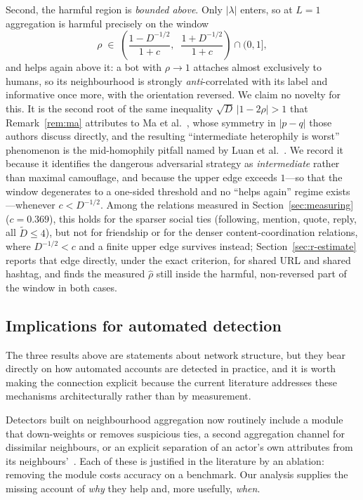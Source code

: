 \documentclass[../elsevier.tex]{subfiles}
\begin{document}
Second, the harmful region is \emph{bounded above}. Only $|\lambda|$ enters, so at
$L=1$ aggregation is harmful precisely on the window
\begin{equation}
    \rho \;\in\;
    \left(\frac{1 - D^{-1/2}}{1+c},\;\; \frac{1 + D^{-1/2}}{1+c}\right)
    \cap (0,1] ,
    \label{eq:window}
\end{equation}
and helps again above it: a bot with $\rho \to 1$ attaches almost exclusively to
humans, so its neighbourhood is strongly \emph{anti}-correlated with its label and
informative once more, with the orientation reversed. We claim no novelty for this.
It is the second root of the same inequality
$\sqrt{D}\,|1-2\rho| > 1$ that Remark~\ref{rem:ma} attributes to
Ma et al.~\citeyearpar{ma2022homophily}, whose symmetry in $|p-q|$ those authors discuss
directly, and the resulting ``intermediate heterophily is worst'' phenomenon is the
mid-homophily pitfall named by Luan et al.~\citeyearpar{luan2023when}. We record it because
it identifies the dangerous adversarial strategy as \emph{intermediate} rather than
maximal camouflage, and because the upper edge exceeds $1$---so that the window
degenerates to a one-sided threshold and no ``helps again'' regime exists---whenever
$c < D^{-1/2}$. Among the relations measured in Section~\ref{sec:measuring}
($c = 0.369$), this holds for the sparser social ties (following, mention, quote,
reply, all $\tilde D \le 4$), but not for friendship or for the denser
content-coordination relations, where $D^{-1/2} < c$ and a finite upper edge
survives instead; Section~\ref{sec:r-estimate} reports that edge directly, under
the exact criterion, for shared URL and shared hashtag, and finds the measured
$\hat\rho$ still inside the harmful, non-reversed part of the window in both
cases.

\subsection{Implications for automated detection}
\label{sec:implications}

The three results above are statements about network structure, but they bear directly
on how automated accounts are detected in practice, and it is worth making the
connection explicit because the current literature addresses these mechanisms
architecturally rather than by measurement.

Detectors built on neighbourhood aggregation now routinely include a module that
down-weights or removes suspicious ties, a second aggregation channel for
dissimilar neighbours, or an explicit separation of an actor's own attributes from its
neighbours'~\citep{dou2020caregnn,he2025bothp,dang2026xhbot}. Each of these is
justified in the literature by an ablation: removing the module costs accuracy on a
benchmark. Our analysis supplies the missing account of \emph{why} they help and,
more usefully, \emph{when}.
\end{document}
